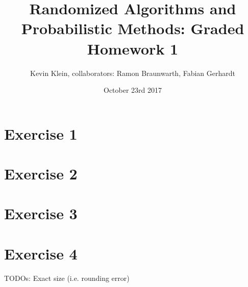 \documentclass[a4paper,german]{article}
\title{Randomized Algorithms and Probabilistic Methods: Graded Homework 1}
\author{ Kevin Klein, collaborators: Ramon Braunwarth, Fabian Gerhardt}
\date{October 23rd 2017}
\begin{document}
\maketitle

\section*{Exercise 1}
\section*{Exercise 2}
\section*{Exercise 3}
\section*{Exercise 4}
TODOs: Exact size (i.e. rounding error)
\end{document}

